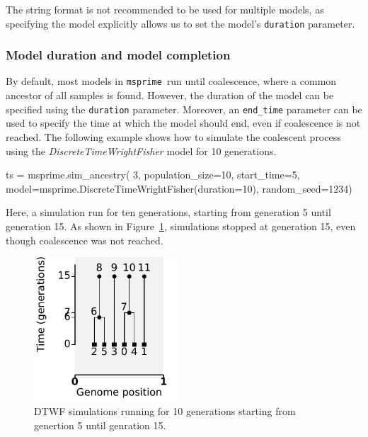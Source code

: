 \documentclass[graybox]{svmult}
\newcommand{\msprime}[0]{\texttt{msprime}}
\begin{document}
The string format is not recommended to be used for multiple models, as specifying the model explicitly allows us to set the model's \texttt{duration}
parameter.

\subsubsection{Model duration and model completion}\label{model-duration-and-model-completion}

By default, most models in \msprime\ run until coalescence, where a common ancestor of all samples is found. However, the duration of the model can be specified
using the \texttt{duration} parameter. Moreover, an \texttt{end\_time} parameter can be used to specify the time at which the model should end, even if coalescence
is not reached. The following example shows how to simulate the coalescent process using the \emph{DiscreteTimeWrightFisher} model for 10 generations.

\begin{pythoncode}

ts = msprime.sim_ancestry(
    3, population_size=10, start_time=5,
    model=msprime.DiscreteTimeWrightFisher(duration=10),
    random_seed=1234)
\end{pythoncode}

Here, a simulation run for ten generations, starting from generation 5 until generation 15. As shown in Figure~\ref{fig:start-duration}, simulations stopped
at generation 15, even though coalescence was not reached.

\begin{figure}
\begin{center}
\includegraphics[width=0.48\textwidth]{images/model-duration-and-model-completion.pdf}
\end{center}
\caption{\label{fig:start-duration} DTWF simulations running for 10 generations starting from genertion 5 until genration 15.}
\end{figure}
\end{document}
